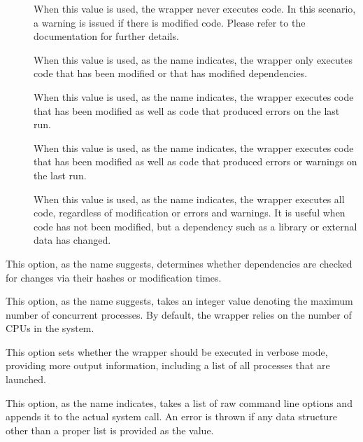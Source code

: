 \begin{description}
\begin{description}
\begin{description}
\item[] When this value is used, the wrapper never executes code. In this scenario, a warning is issued if there is modified code. Please refer to the documentation for further details.

\item[] When this value is used, as the name indicates, the wrapper only executes code that has been modified or that has modified dependencies.

\item[] When this value is used, as the name indicates, the wrapper executes code that has been modified as well as code that produced errors on the last run.

\item[] When this value is used, as the name indicates, the wrapper executes code that has been modified as well as code that produced errors or warnings on the last run.

\item[] When this value is used, as the name indicates, the wrapper executes all code, regardless of modification or errors and warnings. It is useful when code has not been modified, but a dependency such as a library or external data has changed.
\end{description}

\item[\rpsbox{hashdependencies}] This option, as the name suggests, determines whether dependencies are checked for changes via their hashes or modification times. 

\item[\abox{jobs}] This option, as the name suggests, takes an integer value denoting the maximum number of concurrent processes. By default, the wrapper relies on the number of CPUs in the system.

\item[\rpsbox{verbose}] This option sets whether the wrapper should be executed in verbose mode, providing more output information, including a list of all processes that are launched.

\item[\abox{options}] This option, as the name indicates, takes a list of raw command line options and appends it to the actual system call. An error is thrown if any data structure other than a proper list is provided as the value.
\end{description}


\end{description}
